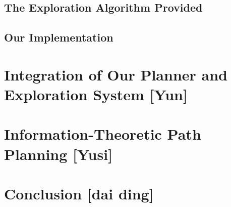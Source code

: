 \documentclass{article}
\begin{document}
\subsection {The Exploration Algorithm Provided}

\subsection {Our Implementation}

\section{Integration of Our Planner and Exploration System [Yun]}

\section{Information-Theoretic Path Planning [Yusi]}

\section{Conclusion [dai ding]}

  


\begin{thebibliography}{1}

\end{thebibliography}


\end{document}
